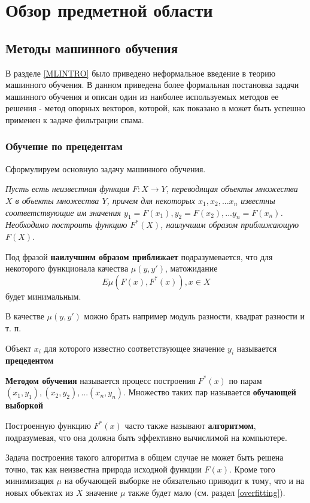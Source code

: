 \newpage
\section{Обзор предметной области}
\label{review}

\subsection{Методы машинного обучения} 
\label{ML}
В разделе \ref{MLINTRO} было приведено неформальное введение в теорию машинного обучения. В данном приведена более формальная постановка задачи машинного обучения и описан один из наиболее используемых методов ее решения - метод опорных векторов, которой, как показано в \cite{ROZ}  может быть успешно применен к задаче фильтрации спама. 
\subsubsection{Обучение по прецедентам}
Сформулируем основную задачу машинного обучения.

\textit{
Пусть есть неизвестная функция $F: X \rightarrow Y$, переводящая объекты
множества $X$ в объекты множества $Y$, причем для некоторых $x_1, x_2, ... x_n$ известны соответствующие им значения $y_1 = F(x_1), y_2 = F(x_2), ... y_n = F(x_n)$.
Необходимо построить функцию $F^*(X)$, наилучшим образом приближающую $F(X)$.
}

Под фразой \textbf{наилучшим образом приближает} подразумевается, что для некоторого функционала качества $\mu(y, y')$, матожидание
\begin{equation}
\label{matozh}
E\mu(F(x), F^*(x)), x \in X
\end{equation}
будет минимальным.

В качестве $\mu(y, y')$ можно брать например модуль разности, квадрат разности и т. п.

Объект $x_i$ для которого известно соответствующее значение $y_i$ называется \textbf{прецедентом}

\textbf{Методом обучения} называется процесс построения $F^*(x)$ по парам $(x_1, y_1), (x_2, y_2), ... (x_n, y_n)$. Множество таких пар называется \textbf{обучающей выборкой}

Построенную функцию $F^*(x)$ часто также называют \textbf{алгоритмом}, подразумевая,  что она должна быть эффективно вычислимой на компьютере.

Задача построения такого алгоритма в общем случае не может быть решена точно, так как неизвестна природа исходной функции $F(x)$. Кроме того минимизация $\mu$ на обучающей выборке не обязательно приводит к тому, что и на новых объектах из $X$ значение $\mu$ также будет мало (см. раздел \ref{overfitting}).

